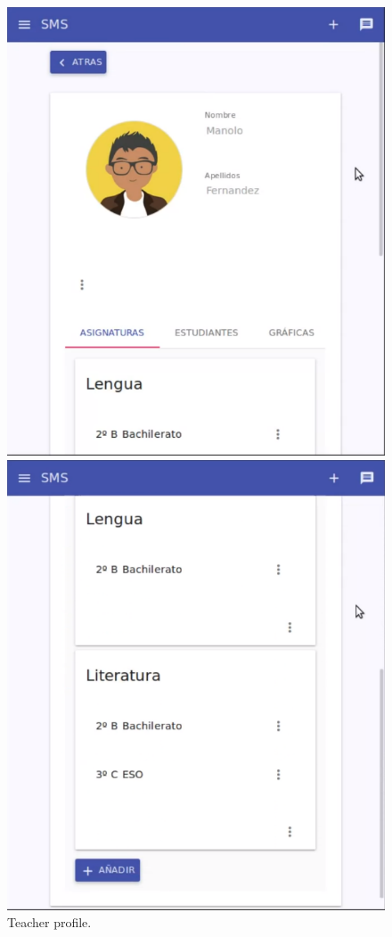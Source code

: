 \begin{figure}[H]
\centering
\begin{minipage}{.5\textwidth}
  \centering
  \includegraphics[scale=0.3]{img/snaps/teacher_profile.png}
  \caption{Teacher profile.}
\end{minipage}%
\begin{minipage}{.5\textwidth}
  \centering
  \includegraphics[scale=0.3]{img/snaps/teacher_profile_2.png}

\end{minipage}
\end{figure}
